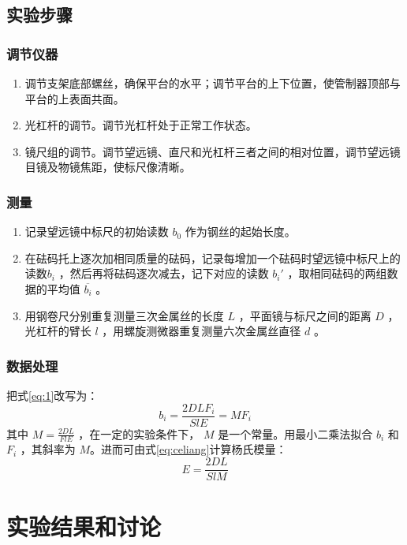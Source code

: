 \documentclass[a4paper]{extarticle}
\begin{document}
    \subsection{实验步骤}
    \subsubsection{调节仪器}
    \begin{enumerate}
        \item 调节支架底部螺丝，确保平台的水平；调节平台的上下位置，使管制器顶部与平台的上表面共面。
        \item 光杠杆的调节。调节光杠杆处于正常工作状态。
        \item 镜尺组的调节。调节望远镜、直尺和光杠杆三者之间的相对位置，调节望远镜目镜及物镜焦距，使标尺像清晰。
    \end{enumerate}
    \subsubsection{测量}
    \begin{enumerate}
        \item 记录望远镜中标尺的初始读数 $b_0$ 作为钢丝的起始长度。
        \item 在砝码托上逐次加相同质量的砝码，记录每增加一个砝码时望远镜中标尺上的读数$b_i$ ，然后再将砝码逐次减去，记下对应的读数 $b_i'$ ，取相同砝码的两组数据的平均值 $\overline{b_i}$ 。
        \item 用钢卷尺分别重复测量三次金属丝的长度 $L$ ，平面镜与标尺之间的距离 $D$ ，光杠杆的臂长 $l$ ，用螺旋测微器重复测量六次金属丝直径 $d$ 。
    \end{enumerate}
    \subsubsection{数据处理}
    \hspace{2em}
    把式\ref{eq:1}改写为：
    \begin{equation*}
        b_i=\frac{2DLF_i}{SlE}=MF_i
    \end{equation*}
    其中 $M=\frac{2DL}{FlE}$ ，在一定的实验条件下， $M$ 是一个常量。用最小二乘法拟合 $b_i$ 和 $F_i$ ，其斜率为 $M$。进而可由式\ref{eq:celiang}计算杨氏模量：
    \begin{equation}
        E=\frac{2DL}{SlM}
        \label{eq:celiang}
    \end{equation}
    \section{实验结果和讨论}
\end{document}

